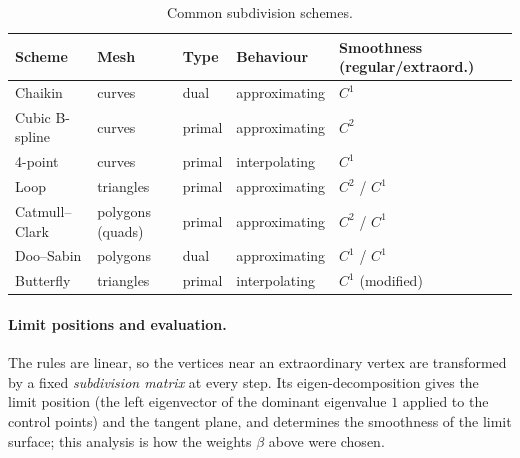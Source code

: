 \begin{table}[tbp]
\centering\small
\begin{tabular}{@{}lllll@{}}
\toprule
Scheme & Mesh & Type & Behaviour & Smoothness (regular/extraord.) \\
\midrule
Chaikin & curves & dual & approximating & $C^1$ \\
Cubic B-spline & curves & primal & approximating & $C^2$ \\
4-point & curves & primal & interpolating & $C^1$ \\
Loop & triangles & primal & approximating & $C^2$ / $C^1$ \\
Catmull--Clark & polygons (quads) & primal & approximating & $C^2$ / $C^1$ \\
Doo--Sabin & polygons & dual & approximating & $C^1$ / $C^1$ \\
Butterfly & triangles & primal & interpolating & $C^1$ (modified) \\
\bottomrule
\end{tabular}
\caption{Common subdivision schemes.}
\label{tab:subdiv}
\end{table}



\paragraph{Limit positions and evaluation.} The rules are linear, so the vertices near an
extraordinary vertex are transformed by a fixed \emph{subdivision matrix} at every step. Its
eigen-decomposition gives the limit position (the left eigenvector of the dominant eigenvalue
$1$ applied to the control points) and the tangent plane, and determines the smoothness of the
limit surface; this analysis is how the weights $\beta$ above were chosen.

